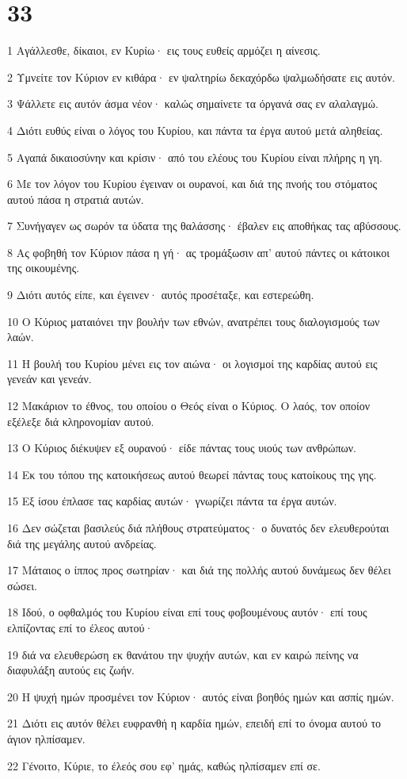 \chapter{33}

\par 1 Αγάλλεσθε, δίκαιοι, εν Κυρίω· εις τους ευθείς αρμόζει η αίνεσις.
\par 2 Υμνείτε τον Κύριον εν κιθάρα· εν ψαλτηρίω δεκαχόρδω ψαλμωδήσατε εις αυτόν.
\par 3 Ψάλλετε εις αυτόν άσμα νέον· καλώς σημαίνετε τα όργανά σας εν αλαλαγμώ.
\par 4 Διότι ευθύς είναι ο λόγος του Κυρίου, και πάντα τα έργα αυτού μετά αληθείας.
\par 5 Αγαπά δικαιοσύνην και κρίσιν· από του ελέους του Κυρίου είναι πλήρης η γη.
\par 6 Με τον λόγον του Κυρίου έγειναν οι ουρανοί, και διά της πνοής του στόματος αυτού πάσα η στρατιά αυτών.
\par 7 Συνήγαγεν ως σωρόν τα ύδατα της θαλάσσης· έβαλεν εις αποθήκας τας αβύσσους.
\par 8 Ας φοβηθή τον Κύριον πάσα η γή· ας τρομάξωσιν απ' αυτού πάντες οι κάτοικοι της οικουμένης.
\par 9 Διότι αυτός είπε, και έγεινεν· αυτός προσέταξε, και εστερεώθη.
\par 10 Ο Κύριος ματαιόνει την βουλήν των εθνών, ανατρέπει τους διαλογισμούς των λαών.
\par 11 Η βουλή του Κυρίου μένει εις τον αιώνα· οι λογισμοί της καρδίας αυτού εις γενεάν και γενεάν.
\par 12 Μακάριον το έθνος, του οποίου ο Θεός είναι ο Κύριος. Ο λαός, τον οποίον εξέλεξε διά κληρονομίαν αυτού.
\par 13 Ο Κύριος διέκυψεν εξ ουρανού· είδε πάντας τους υιούς των ανθρώπων.
\par 14 Εκ του τόπου της κατοικήσεως αυτού θεωρεί πάντας τους κατοίκους της γης.
\par 15 Εξ ίσου έπλασε τας καρδίας αυτών· γνωρίζει πάντα τα έργα αυτών.
\par 16 Δεν σώζεται βασιλεύς διά πλήθους στρατεύματος· ο δυνατός δεν ελευθερούται διά της μεγάλης αυτού ανδρείας.
\par 17 Μάταιος ο ίππος προς σωτηρίαν· και διά της πολλής αυτού δυνάμεως δεν θέλει σώσει.
\par 18 Ιδού, ο οφθαλμός του Κυρίου είναι επί τους φοβουμένους αυτόν· επί τους ελπίζοντας επί το έλεος αυτού·
\par 19 διά να ελευθερώση εκ θανάτου την ψυχήν αυτών, και εν καιρώ πείνης να διαφυλάξη αυτούς εις ζωήν.
\par 20 Η ψυχή ημών προσμένει τον Κύριον· αυτός είναι βοηθός ημών και ασπίς ημών.
\par 21 Διότι εις αυτόν θέλει ευφρανθή η καρδία ημών, επειδή επί το όνομα αυτού το άγιον ηλπίσαμεν.
\par 22 Γένοιτο, Κύριε, το έλεός σου εφ' ημάς, καθώς ηλπίσαμεν επί σε.

